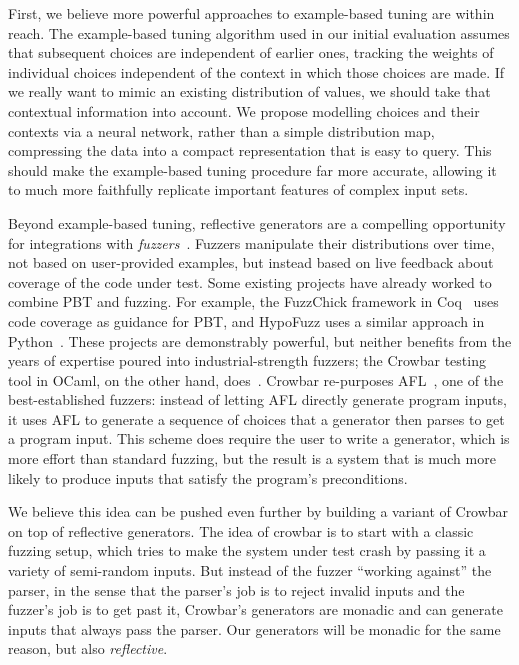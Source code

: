 First, we believe more powerful approaches to example-based tuning are
within reach.  The
example-based tuning algorithm used in
our initial evaluation assumes
that subsequent choices are
independent of earlier ones, tracking the weights of individual
choices independent of the
context in which those choices are made. If we really want to mimic an existing
distribution of values, we should take that contextual information into
account. We propose modelling choices and their contexts via a neural network,
rather than a simple distribution map, compressing the data into a compact
representation that is easy to query.
This should make the example-based tuning
procedure far more accurate, allowing it to much more faithfully replicate
important features of complex input sets.

Beyond example-based tuning, reflective generators are a compelling opportunity
for integrations with {\em
fuzzers}~\cite{miller_1990,Barrett-Wilt_2021,zalewski_american_2022}. Fuzzers
manipulate their distributions over time, not based on user-provided examples,
but instead based on live feedback about coverage of the
code under test.
Some existing projects have already worked to
combine PBT and fuzzing.
For example, the FuzzChick framework in Coq~\cite{DBLP:journals/pacmpl/Lampropoulos0P19}
uses code coverage as guidance for PBT, and HypoFuzz uses a
similar approach in Python~\cite{hatfield-dodds_hypofuzz_nodate}. These projects
are demonstrably powerful, but neither benefits from the years of expertise
poured into industrial-strength fuzzers; the Crowbar testing tool in
OCaml, on the other hand,
does~\cite{dolan2017testing}. Crowbar re-purposes
AFL~\cite{afl-readme}, one of the best-established
fuzzers: instead of letting AFL directly generate program inputs, it
uses AFL
to generate a sequence of choices that a generator then parses to get a program input.
This scheme
does require the user to write a generator, which is more effort
than standard fuzzing, but the result is a system that is much more likely
to produce inputs that satisfy the program's preconditions.

We believe this idea can be pushed even further by building
a variant of Crowbar on top of reflective generators.
The idea of crowbar is to start with a classic fuzzing setup, which tries to make the
system under test
crash by passing it a variety of semi-random inputs. But instead of
the fuzzer
``working against'' the parser, in the sense that the parser's job is to reject
invalid inputs and the fuzzer's job is to get past it, Crowbar's generators are
monadic and can generate
inputs that always pass the parser. Our generators will be monadic for the same
reason, but also {\em reflective}.

